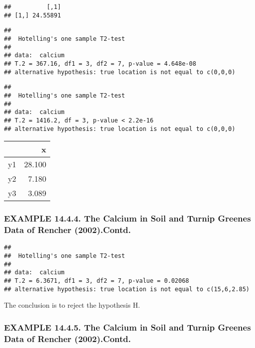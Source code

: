 \documentclass[]{article}
\begin{document}
\begin{verbatim}
##          [,1]
## [1,] 24.55891
\end{verbatim}

\begin{verbatim}
## 
##  Hotelling's one sample T2-test
## 
## data:  calcium
## T.2 = 367.16, df1 = 3, df2 = 7, p-value = 4.648e-08
## alternative hypothesis: true location is not equal to c(0,0,0)
\end{verbatim}

\begin{verbatim}
## 
##  Hotelling's one sample T2-test
## 
## data:  calcium
## T.2 = 1416.2, df = 3, p-value < 2.2e-16
## alternative hypothesis: true location is not equal to c(0,0,0)
\end{verbatim}

\begin{table}[H]
\centering
\begin{tabular}{l|r}
\hline
  & x\\
\hline
y1 & 28.100\\
\hline
y2 & 7.180\\
\hline
y3 & 3.089\\
\hline
\end{tabular}
\end{table}

\hypertarget{example-14.4.4.-the-calcium-in-soil-and-turnip-greenes-data-of-rencher-2002.contd.}{%
\subsubsection{EXAMPLE 14.4.4. The Calcium in Soil and Turnip Greenes
Data of Rencher
(2002).Contd.}\label{example-14.4.4.-the-calcium-in-soil-and-turnip-greenes-data-of-rencher-2002.contd.}}

\begin{verbatim}
## 
##  Hotelling's one sample T2-test
## 
## data:  calcium
## T.2 = 6.3671, df1 = 3, df2 = 7, p-value = 0.02068
## alternative hypothesis: true location is not equal to c(15,6,2.85)
\end{verbatim}

The conclusion is to reject the hypothesis H.

\hypertarget{example-14.4.5.-the-calcium-in-soil-and-turnip-greenes-data-of-rencher-2002.contd.}{%
\subsubsection{EXAMPLE 14.4.5. The Calcium in Soil and Turnip Greenes
Data of Rencher
(2002).Contd.}\label{example-14.4.5.-the-calcium-in-soil-and-turnip-greenes-data-of-rencher-2002.contd.}}
\end{document}
